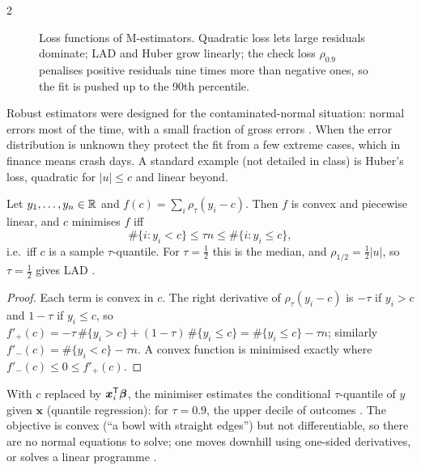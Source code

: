 \begin{paracol}{2}
\begin{figure}[ht]
\centering
{}
\caption{Loss functions of M-estimators. Quadratic loss lets large residuals dominate; LAD and Huber grow
linearly; the check loss $\rho_{0.9}$ penalises positive residuals nine times more than negative ones, so the fit
is pushed up to the 90th percentile.}\label{ch05:fig-losses}
\end{figure}

Robust estimators were designed for the contaminated-normal situation: normal errors most of the time, with a
small fraction of gross errors . When the error distribution is unknown they protect the fit
from a few extreme cases, which in finance means crash days. A standard example (not detailed in class) is
Huber's loss, quadratic for $|u|\le c$ and linear beyond.

\begin{proposition}\label{ch05:prop-quantile}
Let $y_1,\dots,y_n\in\mathbb{R}$ and $f(c)=\sum_i\rho_\tau(y_i-c)$. Then $f$ is convex and piecewise linear, and $c$ minimises $f$ iff
\[
  \#\{i:y_i<c\}\le\tau n\le\#\{i:y_i\le c\},
\]
i.e.\ iff $c$ is a sample $\tau$-quantile. For $\tau=\frac12$ this is the median, and $\rho_{1/2}=\frac12|u|$, so
$\tau=\frac12$ gives LAD .
\end{proposition}
\begin{proof}
Each term is convex in $c$. The right derivative of $\rho_\tau(y_i-c)$ is $-\tau$ if $y_i>c$ and $1-\tau$ if $y_i\le c$,
so $f'_+(c)=-\tau\,\#\{y_i>c\}+(1-\tau)\,\#\{y_i\le c\}=\#\{y_i\le c\}-\tau n$; similarly $f'_-(c)=\#\{y_i<c\}-\tau n$. A convex
function is minimised exactly where $f'_-(c)\le0\le f'_+(c)$.
\end{proof}
With $c$ replaced by $\bm x_i^{\mathsf T}\bm\beta$, the minimiser estimates the conditional $\tau$-quantile of $y$ given $\bm x$
(quantile regression): for $\tau=0.9$, the upper decile of outcomes . The objective is convex
(``a bowl with straight edges'') but not differentiable, so there are no normal equations to solve; one moves
downhill using one-sided derivatives, or solves a linear programme .


\end{paracol}
